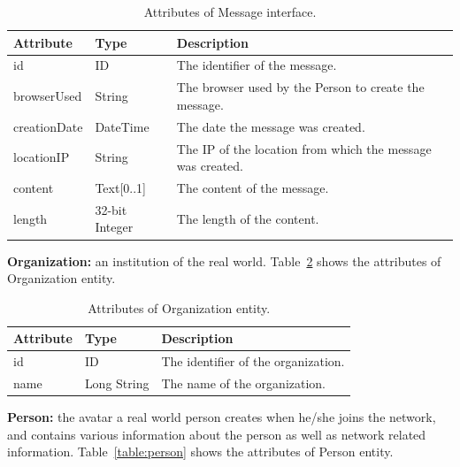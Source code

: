 \begin{table}[H]
    \begin{tabular}{|p{\attributecolumn}|p{\typecolumn}|p{\descriptioncolumn}|}
        \hline
        \textbf{Attribute} & \textbf{Type} & \textbf{Description} \\
        \hline
        id & ID  & The identifier of the message.\\
        \hline
        browserUsed & String  & The browser used by the Person to create the message.\\
        \hline
        creationDate & DateTime  & The date the message was created.\\
        \hline
        locationIP & String  & The IP of the location from which the message was created.\\
        \hline
        content & Text[0..1]  & The content of the message.\\
        \hline
        length & 32-bit Integer  & The length of the content.\\
        \hline
    \end{tabular}
    \caption{Attributes of Message interface.}
    \label{table:message}
\end{table}

{\flushleft \textbf{Organization:}} an institution of the real
world. Table~\ref{table:organization} shows the attributes of Organization
entity.

\begin{table}[H]
    \begin{tabular}{|p{\attributecolumn}|p{\typecolumn}|p{\descriptioncolumn}|}
        \hline
        \textbf{Attribute} & \textbf{Type} & \textbf{Description} \\
        \hline
        id & ID  & The identifier of the organization.\\
        \hline
        name & Long String  & The name of the organization.\\
        \hline
    \end{tabular}
    \caption{Attributes of Organization entity.}
    \label{table:organization}
\end{table}

{\flushleft \textbf{Person:}} the avatar a real world person creates
when he/she joins the network, and contains various information about the
person as well as network related information. Table~\ref{table:person} shows
the attributes of Person entity.

